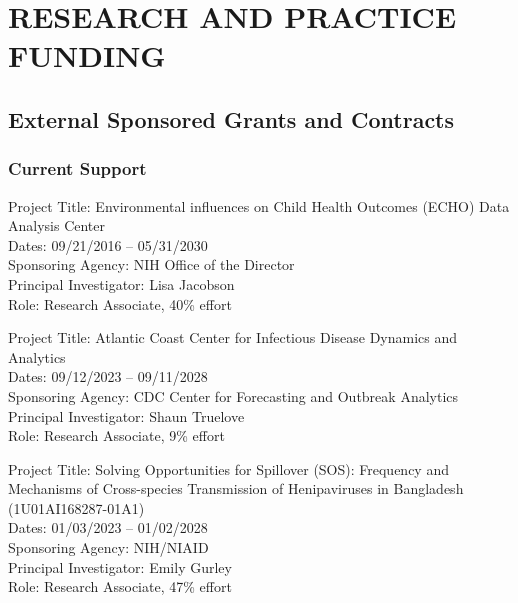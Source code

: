 \documentclass{cv}
\begin{document}
\section*{RESEARCH AND PRACTICE FUNDING}

\subsection*{External Sponsored Grants and Contracts}

\subsubsection*{Current Support}

Project Title: Environmental influences on Child Health Outcomes (ECHO) Data Analysis Center \\
Dates: 09/21/2016 -- 05/31/2030 \\
Sponsoring Agency: NIH Office of the Director \\
Principal Investigator: Lisa Jacobson \\
Role: Research Associate, 40\% effort

Project Title: Atlantic Coast Center for Infectious Disease Dynamics and Analytics \\
Dates: 09/12/2023 -- 09/11/2028 \\
Sponsoring Agency: CDC Center for Forecasting and Outbreak Analytics \\
Principal Investigator: Shaun Truelove \\
Role: Research Associate, 9\% effort

Project Title: Solving Opportunities for Spillover (SOS): Frequency and Mechanisms of Cross-species Transmission of Henipaviruses in Bangladesh (1U01AI168287-01A1) \\
Dates: 01/03/2023 -- 01/02/2028 \\
Sponsoring Agency: NIH/NIAID \\
Principal Investigator: Emily Gurley \\
Role: Research Associate, 47\% effort
\end{document}
